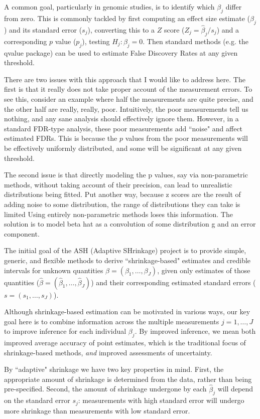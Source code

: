 \documentclass[11pt]{article}
\begin{document}
A common goal, particularly in genomic studies, is to identify which $\beta_j$ differ from zero. This is commonly tackled
by first computing an effect size estimate ($\hat\beta_j$) and its standard error ($s_j$), converting this to a $Z$ score ($Z_j=\hat\beta_j/s_j$)
and a corresponding $p$ value ($p_j$), testing $H_j:\beta_j=0$.  Then standard methods (e.g. the qvalue package) can be used
to estimate False Discovery Rates at any given threshold. 

There are two issues with this approach that I would like to address here. The first is that it really does not take proper account of the measurement errors. To see this, consider an example where half the measurements are quite precise, and the other half are really, really, poor. Intuitively, the poor measurements tell us nothing, and any sane analysis should effectively ignore them. However, in a standard FDR-type analysis, these poor measurements add ``noise" and affect estimated FDRs. This is because the $p$ values from the poor measurements will be effectively uniformly distributed, and some will be significant at any given threshold. 

The second issue is that directly modeling the p values, say via non-parametric methods, without taking account of their precision, 
can lead to unrealistic distributions being fitted. Put another way, because z scores are the result of adding noise to some
distribution, the range of distributions they can take is limited Using entirely non-parametric methods loses this information.
The solution is to model beta hat as a convolution of some distribution g and an error component.

The initial goal of the ASH (Adaptive SHrinkage) project is to provide simple, generic, and flexible methods to derive ``shrinkage-based" estimates and credible intervals for unknown quantities $\beta=(\beta_1,\dots,\beta_J)$, given only estimates of those quantities ($\hat\beta=(\hat\beta_1,\dots, \hat\beta_J)$) and their corresponding estimated standard errors ($s=(s_1,\dots,s_J)$). 

Although shrinkage-based estimation can be motivated in various ways, our key goal here is to combine information across the multiple measurements $j=1,\dots,J$ to improve inference for each individual $\beta_j$. By improved inference, we mean both
improved average accuracy of point estimates, which is
the traditional focus of shrinkage-based methods, \emph{and} improved assessments of uncertainty. 

By ``adaptive" shrinkage we 
have two key properties in mind. First, the appropriate amount of shrinkage is determined from the data, rather than being pre-specified. Second, the amount of shrinkage undergone by each $\hat\beta_j$ will depend on the standard error $s_j$: measurements with high standard error will undergo more shrinkage than measurements with low standard error.
\end{document}
